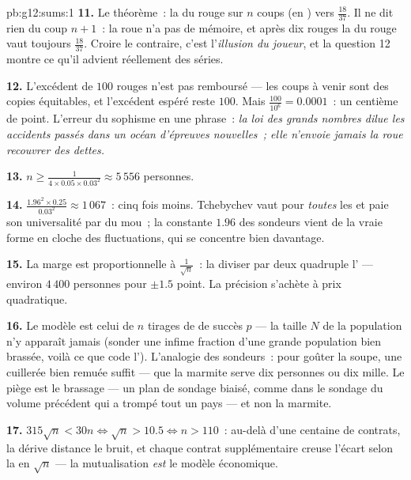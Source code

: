 \begin{solution}{pb:g12:sums:1}
\textbf{11.} Le théorème~: la \emph{} du rouge sur $n$
coups  (en ) vers $\frac{18}{37}$. Il ne dit
rien du coup $n + 1$~: la roue n'a pas de mémoire, et après dix
rouges la  du rouge vaut toujours $\frac{18}{37}$.
Croire le contraire, c'est l'\emph{illusion du joueur}, et la
question 12 montre ce qu'il advient réellement des séries.

\textbf{12.} L'excédent de $100$ rouges n'est pas remboursé --- les
coups à venir sont des copies équitables, et l'excédent espéré reste
$100$. Mais $\frac{100}{10^6} = 0.0001$~: un centième de point.
L'erreur du sophisme en une phrase~: \emph{la loi des grands nombres
dilue les accidents passés dans un océan d'épreuves nouvelles~; elle
n'envoie jamais la roue recouvrer des dettes.}

\textbf{13.} $n \geq \frac{1}{4 \times 0.05 \times 0.03^2}
\approx 5\,556$ personnes.

\textbf{14.} $\frac{1.96^2 \times 0.25}{0.03^2} \approx 1\,067$~:
cinq fois moins. Tchebychev vaut pour \emph{toutes} les  et paie
son universalité par du mou~; la constante $1.96$ des sondeurs vient
de la vraie forme en cloche des fluctuations, qui se concentre bien
davantage.

\textbf{15.} La marge est proportionnelle à $\frac{1}{\sqrt n}$~:
la diviser par deux quadruple l' --- environ $4\,400$
personnes pour $\pm 1.5$ point. La précision s'achète à prix
quadratique.

\textbf{16.} Le modèle est celui de $n$ tirages  de
 de succès $p$ --- la taille $N$ de la population n'y
apparaît jamais (sonder une infime fraction d'une grande population
bien brassée, voilà ce que code l'). L'analogie des
sondeurs~: pour goûter la soupe, une cuillerée bien remuée suffit
--- que la marmite serve dix personnes ou dix mille. Le piège est le
brassage --- un plan de sondage biaisé, comme dans le sondage du
volume précédent qui a trompé tout un pays --- et non la marmite.

\textbf{17.} $315\sqrt n < 30n \iff \sqrt n > 10.5 \iff n > 110$~:
au-delà d'une centaine de contrats, la dérive distance le bruit, et
chaque contrat supplémentaire creuse l'écart selon la  en
$\sqrt n$ --- la mutualisation \emph{est} le modèle économique.


\end{solution}
